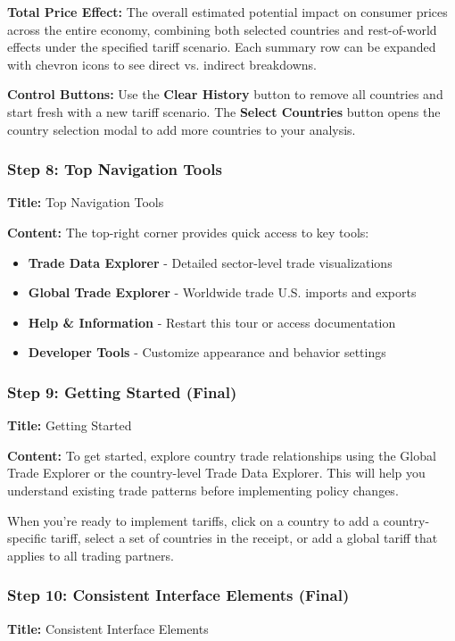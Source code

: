 \documentclass[11pt]{article}
\begin{document}
\textbf{Total Price Effect:} The overall estimated potential impact on consumer prices across the entire economy, combining both selected countries and rest-of-world effects under the specified tariff scenario. Each summary row can be expanded with chevron icons to see direct vs. indirect breakdowns.

\textbf{Control Buttons:} Use the \textbf{Clear History} button to remove all countries and start fresh with a new tariff scenario. The \textbf{Select Countries} button opens the country selection modal to add more countries to your analysis.

\subsubsection{Step 8: Top Navigation Tools}
\textbf{Title:} Top Navigation Tools

\textbf{Content:} The top-right corner provides quick access to key tools:
\begin{itemize}
    \item \textbf{Trade Data Explorer} - Detailed sector-level trade visualizations
    \item \textbf{Global Trade Explorer} - Worldwide trade U.S. imports and exports
    \item \textbf{Help \& Information} - Restart this tour or access documentation
    \item \textbf{Developer Tools} - Customize appearance and behavior settings
\end{itemize}

\subsubsection{Step 9: Getting Started (Final)}
\textbf{Title:} Getting Started

\textbf{Content:} To get started, explore country trade relationships using the Global Trade Explorer or the country-level Trade Data Explorer. This will help you understand existing trade patterns before implementing policy changes.

When you're ready to implement tariffs, click on a country to add a country-specific tariff, select a set of countries in the receipt, or add a global tariff that applies to all trading partners.

\subsubsection{Step 10: Consistent Interface Elements (Final)}
\textbf{Title:} Consistent Interface Elements
\end{document}
